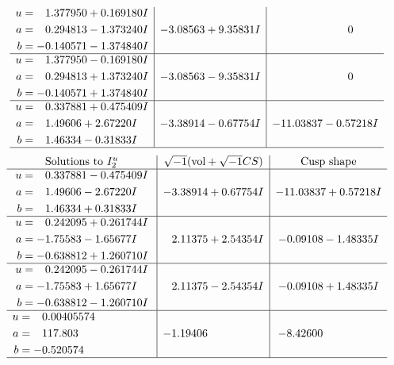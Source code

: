 \documentclass[1p]{elsarticle_modified}
\theoremstyle{definition}
\newcommand{\I}{\sqrt{-1}}
\begin{document}
$$\begin{array}{c|c|c}
\begin{aligned}
u &= \phantom{-}1.377950 + 0.169180 I \\
a &= \phantom{-}0.294813 - 1.373240 I \\
b &= -0.140571 - 1.374840 I\end{aligned}
 & -3.08563 + 9.35831 I & \phantom{-0.000000 } 0 \\ \hline\begin{aligned}
u &= \phantom{-}1.377950 - 0.169180 I \\
a &= \phantom{-}0.294813 + 1.373240 I \\
b &= -0.140571 + 1.374840 I\end{aligned}
 & -3.08563 - 9.35831 I & \phantom{-0.000000 } 0 \\ \hline\begin{aligned}
u &= \phantom{-}0.337881 + 0.475409 I \\
a &= \phantom{-}1.49606 + 2.67220 I \\
b &= \phantom{-}1.46334 - 0.31833 I\end{aligned}
 & -3.38914 - 0.67754 I & -11.03837 - 0.57218 I\\
 \hline 
 \end{array}$$\newpage$$\begin{array}{c|c|c}  
\text{Solutions to }I^u_{2}& \I (\text{vol} + \sqrt{-1}CS) & \text{Cusp shape}\\
 \hline 
\begin{aligned}
u &= \phantom{-}0.337881 - 0.475409 I \\
a &= \phantom{-}1.49606 - 2.67220 I \\
b &= \phantom{-}1.46334 + 0.31833 I\end{aligned}
 & -3.38914 + 0.67754 I & -11.03837 + 0.57218 I \\ \hline\begin{aligned}
u &= \phantom{-}0.242095 + 0.261744 I \\
a &= -1.75583 - 1.65677 I \\
b &= -0.638812 + 1.260710 I\end{aligned}
 & \phantom{-}2.11375 + 2.54354 I & -0.09108 - 1.48335 I \\ \hline\begin{aligned}
u &= \phantom{-}0.242095 - 0.261744 I \\
a &= -1.75583 + 1.65677 I \\
b &= -0.638812 - 1.260710 I\end{aligned}
 & \phantom{-}2.11375 - 2.54354 I & -0.09108 + 1.48335 I \\ \hline\begin{aligned}
u &= \phantom{-}0.00405574\phantom{ +0.000000I} \\
a &= \phantom{-}117.803\phantom{ +0.000000I} \\
b &= -0.520574\phantom{ +0.000000I}\end{aligned}
 & -1.19406\phantom{ +0.000000I} & -8.42600\phantom{ +0.000000I}\\
 \hline 
 \end{array}$$\newpage\newpage\renewcommand{\arraystretch}{1}
\end{document}
